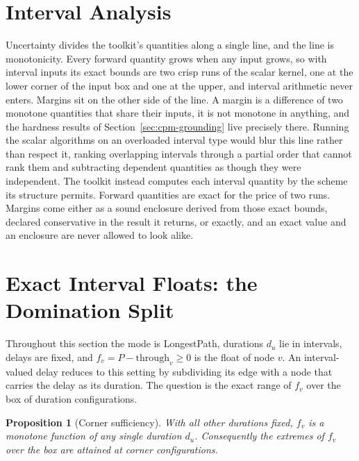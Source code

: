 \documentclass[12pt]{report}
\newtheorem{proposition}[theorem]{Proposition}
\begin{document}
\section{Interval Analysis}
\label{sec:cpm-interval}

Uncertainty divides the toolkit's quantities along a single line, and the
line is monotonicity. Every forward quantity grows when any input grows, so
with interval inputs its exact bounds are two crisp runs of the scalar
kernel, one at the lower corner of the input box and one at the upper, and
interval arithmetic never enters. Margins sit on the other side of the
line. A margin is a difference of two monotone quantities that share their
inputs, it is not monotone in anything, and the hardness results of
Section~\ref{sec:cpm-grounding} live precisely there. Running the scalar
algorithms on an overloaded interval type would blur this line rather than
respect it, ranking overlapping intervals through a partial order that
cannot rank them and subtracting dependent quantities as though they were
independent. The toolkit instead computes each interval quantity by the
scheme its structure permits. Forward quantities are exact for the price of
two runs. Margins come either as a sound enclosure derived from those exact
bounds, declared conservative in the result it returns, or exactly, and an
exact value and an enclosure are never allowed to look alike.

\section{Exact Interval Floats: the Domination Split}
\label{sec:cpm-split}

Throughout this section the mode is LongestPath, durations $d_u$ lie in
intervals, delays are fixed, and $f_v = P - \mathrm{through}_v \ge 0$ is the
float of node $v$. An interval-valued delay reduces to this setting by
subdividing its edge with a node that carries the delay as its duration. The
question is the exact range of $f_v$ over the box of duration configurations.

\begin{proposition}[Corner sufficiency]
\label{prop:cpm-corner}
With all other durations fixed, $f_v$ is a monotone function of any single
duration $d_u$. Consequently the extremes of $f_v$ over the box are attained
at corner configurations.
\end{proposition}
\end{document}
